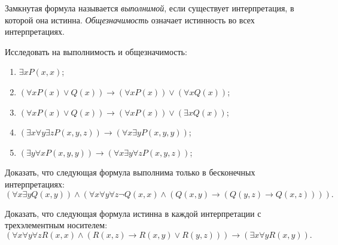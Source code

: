 \documentclass[a4paper, 12pt, num=Я1]{listok}
\begin{document}
\begin{definition}
	Замкнутая формула называется \textit{выполнимой}, если существует интерпретация, в которой она истинна.
	\textit{Общезначимость} означает истинность во всех интерпретациях.
\end{definition}
\begin{problem}
	Исследовать на выполнимость и общезначимость:
	\begin{enumerate}
		\item $\exists{x} P (x, x)$;
		\item $(\forall{x} P(x) \vee Q(x)) \to (\forall{x} P(x)) \vee (\forall{x} Q(x))$;
		\item $(\forall{x} P(x) \vee Q(x)) \to (\forall{x} P(x)) \vee (\exists{x} Q(x))$;
		\item $(\exists x \forall y \exists z P(x, y, z)) \to (\forall x \exists y P(x, y, y))$;
		\item $(\exists y \forall x P(x, y, y)) \to  (\forall x \exists y \forall z P(x, y, z))$;
	\end{enumerate}
\end{problem}
\begin{problem}
	Доказать, что следующая формула выполнима только в бесконечных интерпретациях:
	\[
		(\forall x \exists y Q(x, y)) \wedge (\forall x \forall y \forall z \neg Q(x, x) \wedge (Q(x, y) \to (Q(y, z) \to Q(x, z)))).
	\]
\end{problem}
\begin{problem}
	Доказать, что следующая формула истинна в каждой интерпретации с трехэлементным носителем:
	\[
		(\forall x \forall y \forall z R(x, x) \wedge (R(x, z) \to R(x, y) \vee R(y, z))) \to (\exists x \forall y R(x, y)).
	\]
\end{problem}
\end{document}
